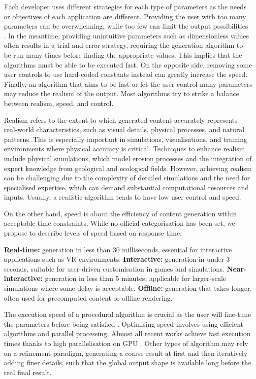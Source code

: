 Each developer uses different strategies for each type of parameters as the needs or objectives of each application are different. Providing the user with too many parameters can be overwhelming, while too few can limit the output possibilities \cite{Togelius2013}. In the meantime, providing unintuitive parameters such as dimensionless values often results in a trial-and-error strategy, requiring the generation algorithm to be run many times before finding the appropriate values. This implies that the algorithms must be able to be executed fast. On the opposite side, removing some user controls to use hard-coded constants instead can greatly increase the speed. Finally, an algorithm that aims to be fast or let the user control many parameters may reduce the realism of the output. Most algorithms try to strike a balance between realism, speed, and control.

Realism refers to the extent to which generated content accurately represents real-world characteristics, such as visual details, physical processes, and natural patterns. This is especially important in simulations, visualisations, and training environments where physical accuracy is critical. Techniques to enhance realism include physical simulations, which model erosion processes and the integration of expert knowledge from geological and ecological fields. However, achieving realism can be challenging due to the complexity of detailed simulations and the need for specialised expertise, which can demand substantial computational resources and inputs. Usually, a realistic algorithm tends to have low user control and speed.

On the other hand, speed is about the efficiency of content generation within acceptable time constraints. While no official categorisation has been set, we propose to describe levels of speed based on response time:
\begin{Itemize}
    \Item{} \textbf{Real-time:} generation in less than 30 milliseconds, essential for interactive applications such as VR environments.
    \Item{} \textbf{Interactive:} generation in under 3 seconds, suitable for user-driven customisation in games and simulations.
    \Item{} \textbf{Near-interactive:} generation in less than 5 minutes, applicable for larger-scale simulations where some delay is acceptable.
    \Item{} \textbf{Offline:} generation that takes longer, often used for precomputed content or offline rendering.
\end{Itemize}

The execution speed of a procedural algorithm is crucial as the user will fine-tune the parameters before being satisfied \cite{Smelik2014}.
Optimising speed involves using efficient algorithms and parallel processing. Almost all recent works achieve fast execution times thanks to high parallelisation on GPU \cite{Olsen2004}. Other types of algorithm may rely on a refinement paradigm, generating a coarse result at first and then iteratively adding finer details, such that the global output shape is available long before the real final result.


